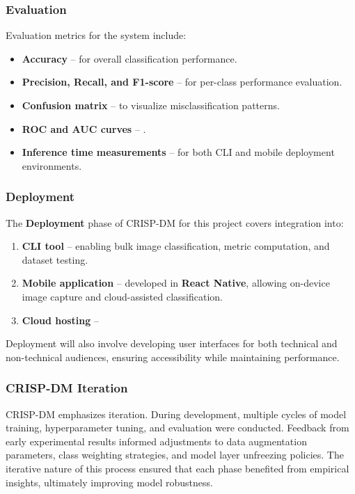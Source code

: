 \documentclass[
  12pt,
  oneside]{article}
\providecommand{\tightlist}{%
  \setlength{\itemsep}{0pt}\setlength{\parskip}{0pt}}
\begin{document}
\subsubsection{Evaluation}\label{evaluation}

Evaluation metrics for the system include:

\begin{itemize}
\tightlist
\item
  \textbf{Accuracy} -- for overall classification performance.
\item
  \textbf{Precision, Recall, and F1-score} -- for per-class performance
  evaluation.
\item
  \textbf{Confusion matrix} -- to visualize misclassification patterns.
\item
  \textbf{ROC and AUC curves} -- .
\item
  \textbf{Inference time measurements} -- for both CLI and mobile
  deployment environments.
\end{itemize}

\subsubsection{Deployment}\label{deployment}

The \textbf{Deployment} phase of CRISP-DM for this project covers
integration into:

\begin{enumerate}
\def\labelenumi{\arabic{enumi}.}
\tightlist
\item
  \textbf{CLI tool} -- enabling bulk image classification, metric
  computation, and dataset testing.
\item
  \textbf{Mobile application} -- developed in \textbf{React Native},
  allowing on-device image capture and cloud-assisted classification.
\item
  \textbf{Cloud hosting} --
\end{enumerate}

Deployment will also involve developing user interfaces for both
technical and non-technical audiences, ensuring accessibility while
maintaining performance.

\subsubsection{CRISP-DM Iteration}\label{crisp-dm-iteration}

CRISP-DM emphasizes iteration. During development, multiple cycles of
model training, hyperparameter tuning, and evaluation were conducted.
Feedback from early experimental results informed adjustments to data
augmentation parameters, class weighting strategies, and model layer
unfreezing policies. The iterative nature of this process ensured that
each phase benefited from empirical insights, ultimately improving model
robustness.
\end{document}
